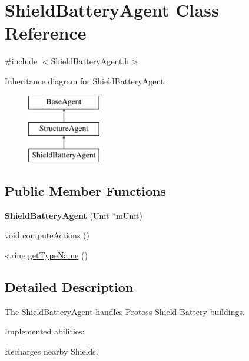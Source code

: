 \hypertarget{class_shield_battery_agent}{
\section{ShieldBatteryAgent Class Reference}
\label{class_shield_battery_agent}
}


{\ttfamily \#include $<$ShieldBatteryAgent.h$>$}

Inheritance diagram for ShieldBatteryAgent:\begin{figure}[H]
\begin{center}
\leavevmode
\includegraphics[height=3.000000cm]{class_shield_battery_agent}
\end{center}
\end{figure}
\subsection*{Public Member Functions}
\begin{DoxyCompactItemize}
\item 
\hypertarget{class_shield_battery_agent_a4e5744607143f17675d8d09bda9ec887}{
{\bfseries ShieldBatteryAgent} (Unit $\ast$mUnit)}
\label{class_shield_battery_agent_a4e5744607143f17675d8d09bda9ec887}

\item 
void \hyperlink{class_shield_battery_agent_a796c50ee98b8c544967a661387d17597}{computeActions} ()
\item 
string \hyperlink{class_shield_battery_agent_a703baf96e43efb7e544396e0001da7c6}{getTypeName} ()
\end{DoxyCompactItemize}


\subsection{Detailed Description}
The \hyperlink{class_shield_battery_agent}{ShieldBatteryAgent} handles Protoss Shield Battery buildings.

Implemented abilities:
\begin{DoxyItemize}
\item Recharges nearby Shields.
\end{DoxyItemize}

